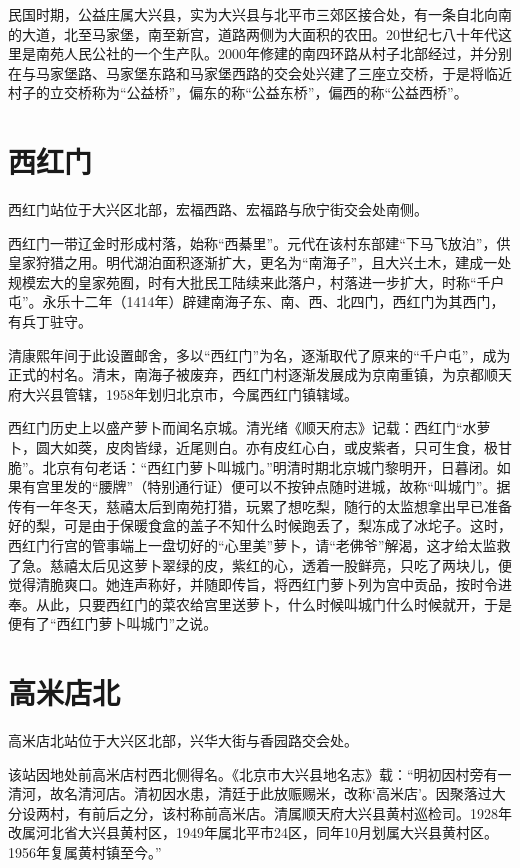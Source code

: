 民国时期，公益庄属大兴县，实为大兴县与北平市三郊区接合处，有一条自北向南的大道，北至马家堡，南至新宫，道路两侧为大面积的农田。20世纪七八十年代这里是南苑人民公社的一个生产队。2000年修建的南四环路从村子北部经过，并分别在与马家堡路、马家堡东路和马家堡西路的交会处兴建了三座立交桥，于是将临近村子的立交桥称为“公益桥”，偏东的称“公益东桥”，偏西的称“公益西桥”。

\section{西红门}
西红门站位于大兴区北部，宏福西路、宏福路与欣宁街交会处南侧。

西红门一带辽金时形成村落，始称“西綦里”。元代在该村东部建“下马飞放泊”，供皇家狩猎之用。明代湖泊面积逐渐扩大，更名为“南海子”，且大兴土木，建成一处规模宏大的皇家苑囿，时有大批民工陆续来此落户，村落进一步扩大，时称“千户屯”。永乐十二年（1414年）辟建南海子东、南、西、北四门，西红门为其西门，有兵丁驻守。

清康熙年间于此设置邮舍，多以“西红门”为名，逐渐取代了原来的“千户屯”，成为正式的村名。清末，南海子被废弃，西红门村逐渐发展成为京南重镇，为京都顺天府大兴县管辖，1958年划归北京市，今属西红门镇辖域。

西红门历史上以盛产萝卜而闻名京城。清光绪《顺天府志》记载：西红门“水萝卜，圆大如葖，皮肉皆绿，近尾则白。亦有皮红心白，或皮紫者，只可生食，极甘脆”。北京有句老话：“西红门萝卜叫城门。”明清时期北京城门黎明开，日暮闭。如果有宫里发的“腰牌”（特别通行证）便可以不按钟点随时进城，故称“叫城门”。据传有一年冬天，慈禧太后到南苑打猎，玩累了想吃梨，随行的太监想拿出早已准备好的梨，可是由于保暖食盒的盖子不知什么时候跑丢了，梨冻成了冰坨子。这时，西红门行宫的管事端上一盘切好的“心里美”萝卜，请“老佛爷”解渴，这才给太监救了急。慈禧太后见这萝卜翠绿的皮，紫红的心，透着一股鲜亮，只吃了两块儿，便觉得清脆爽口。她连声称好，并随即传旨，将西红门萝卜列为宫中贡品，按时令进奉。从此，只要西红门的菜农给宫里送萝卜，什么时候叫城门什么时候就开，于是便有了“西红门萝卜叫城门”之说。

\section{高米店北}
高米店北站位于大兴区北部，兴华大街与香园路交会处。

该站因地处前高米店村西北侧得名。《北京市大兴县地名志》载：“明初因村旁有一清河，故名清河店。清初因水患，清廷于此放赈赐米，改称‘高米店’。因聚落过大分设两村，有前后之分，该村称前高米店。清属顺天府大兴县黄村巡检司。1928年改属河北省大兴县黄村区，1949年属北平市24区，同年10月划属大兴县黄村区。1956年复属黄村镇至今。”

